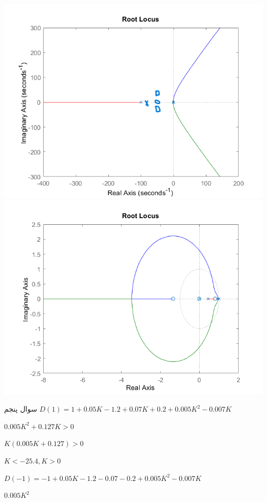\documentclass[12pt]{article}
\begin{document}
    \includegraphics[scale=0.7]{Resources/5.png}
    \includegraphics[scale=0.7]{Resources/6.png}
    
    \begin{problem}{سوال پنجم}
    	\raggedleft
    	$D(1) = 1 + 0.05K - 1.2 + 0.07K + 0.2 + 0.005K^2 - 0.007K $
    	
    	$0.005K^2 + 0.127K > 0$
    	
    	$K(0.005K + 0.127) > 0$
    	
    	$K < -25.4 , K > 0$
    	
    	$D(-1) = -1 + 0.05K - 1.2 - 0.07 - 0.2 + 0.005K^2 - 0.007K$
    	
    	$0.005K^2 $
    
    \end{problem}
    
\end{document}
